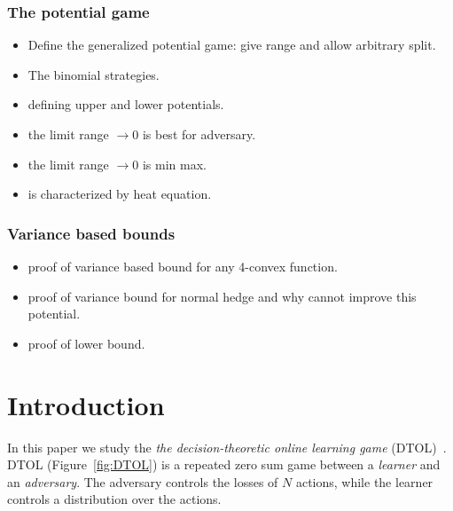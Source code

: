 \documentclass[anon,12pt]{colt2024} %
\begin{document}
\subsubsection{The potential game}
\begin{itemize}
\item Define the generalized potential game: give range and allow arbitrary split.
\item The binomial strategies.
\item defining upper and lower potentials.
\item the limit range $\to 0$ is best for adversary.
\item the limit range $\to 0$ is min max.
\item is characterized by heat equation.
  \end{itemize}
\subsubsection{Variance based bounds}
\begin{itemize}
\item proof of variance based bound for any 4-convex function.
\item proof of variance bound for normal hedge and why cannot improve this potential.
\item proof of lower bound.
  \end{itemize}

\section{Introduction}
In this paper we study the {\em the decision-theoretic online learning game}
(DTOL)~\cite{freund1997decision}. DTOL (Figure~\ref{fig:DTOL}) is a
repeated zero sum game between a {\em learner} and an {\em
  adversary}. The adversary controls the losses of $N$ actions, while
the learner controls a distribution over the actions.
\newcommand{\Pvec}[1]{\vec{P}^{#1}}
\newcommand{\lvec}[1]{\vec{l}_{#1}}
\newcommand{\Lvec}[1]{\vec{L}_{#1}}
\newcommand{\Rvec}[1]{\vec{R}^{#1}}
\end{document}
